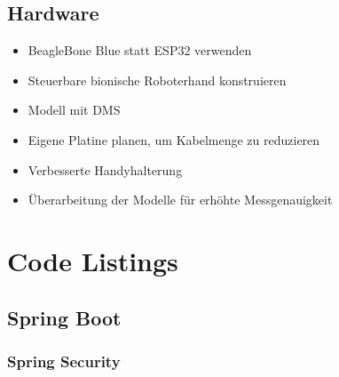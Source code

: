 \documentclass[paper=a4,12pt]{scrreprt}
\begin{document}
\section{Hardware}
\begin{itemize}
  \item BeagleBone Blue statt ESP32 verwenden
  \item Steuerbare bionische Roboterhand konstruieren
  \item Modell mit DMS
  \item Eigene Platine planen, um Kabelmenge zu reduzieren
  \item Verbesserte Handyhalterung
  \item Überarbeitung der Modelle für erhöhte Messgenauigkeit
\end{itemize}

\appendix

\chapter{Code Listings}

\section{Spring Boot}

\subsection{Spring Security}
\end{document}
